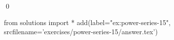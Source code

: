
    \begin{ex}
  \label{ex:power-series-15}
  
  \qed
\end{ex}
\begin{python0}
from solutions import *
add(label="ex:power-series-15",
    srcfilename='exercises/power-series-15/answer.tex') 
\end{python0}                              
